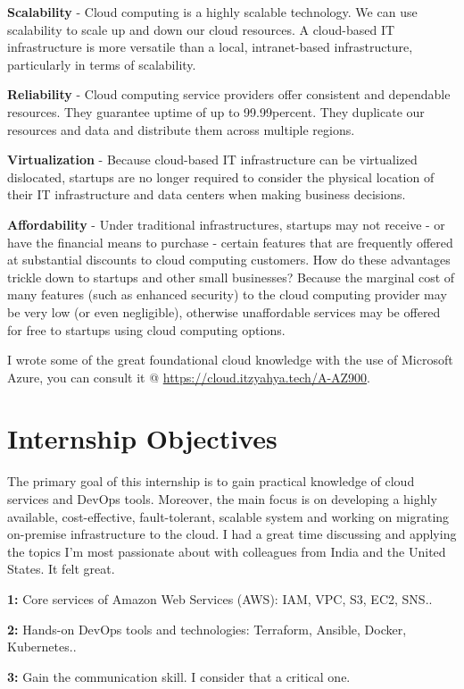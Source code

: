 \textbf{Scalability} - Cloud computing is a highly scalable technology. We can use scalability to scale up and down our cloud resources. A cloud-based IT infrastructure is more versatile than a local, intranet-based infrastructure, particularly in terms of scalability.

\textbf{Reliability} - Cloud computing service providers offer consistent and dependable resources. They guarantee uptime of up to 99.99percent. They duplicate our resources and data and distribute them across multiple regions.

\textbf{Virtualization} - Because cloud-based IT infrastructure can be virtualized dislocated, startups are no longer required to consider the physical location of their IT infrastructure and data centers when making business decisions.

\textbf{Affordability} - Under traditional infrastructures, startups may not receive - or have the financial means to purchase - certain features that are frequently offered at substantial discounts to cloud computing customers. How do these advantages trickle down to startups and other small businesses? Because the marginal cost of many features (such as enhanced security) to the cloud computing provider may be very low (or even negligible), otherwise unaffordable services may be offered for free to startups using cloud computing options.

I wrote some of the great foundational cloud knowledge with the use of Microsoft Azure, you can consult it @  \href{https://cloud.itzyahya.tech/A-AZ900}{https://cloud.itzyahya.tech/A-AZ900}.  

\section{Internship Objectives }
The primary goal of this internship is to gain practical knowledge of cloud services and DevOps tools. Moreover, the main focus is on developing a highly available, cost-effective, fault-tolerant, scalable system and working on migrating on-premise infrastructure to the cloud. I had a great time discussing and applying the topics I'm most passionate about with colleagues from India and the United States. It felt great.
\item \textbf{1:} Core services of Amazon Web Services (AWS): IAM, VPC, S3, EC2, SNS..
\item  \textbf{2:} Hands-on DevOps tools and technologies: Terraform, Ansible, Docker, Kubernetes..
\item  \textbf{3:} Gain the communication skill. I consider that a critical one.



